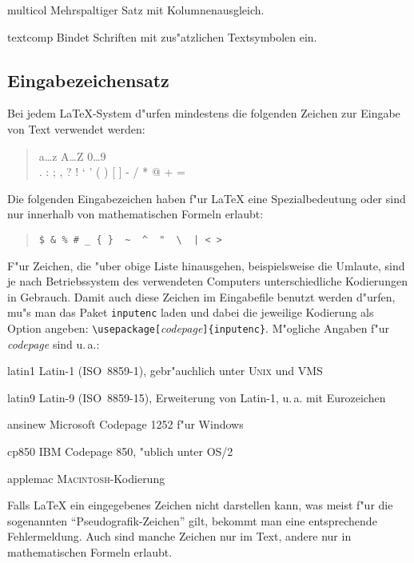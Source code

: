 \begin{table}[htbp]
\begin{ttdescription}
\item[multicol] Mehrspaltiger Satz mit Kolumnenausgleich.
\item[textcomp] Bindet Schriften mit zus"atzlichen Textsymbolen ein.
\end{ttdescription}
\unten
\end{table}


\subsection{Eingabezeichensatz}\label{inputenc}

Bei jedem \LaTeX-System d"urfen mindestens die folgenden
Zeichen zur Eingabe von Text verwendet werden:
\begin{quote}
  \ttfamily
  a\dots z A\dots Z 0\dots 9 \\
  . : ; , ? ! ` ' ( ) [ ] - / * @ + =
\end{quote}
Die folgenden Eingabezeichen haben f"ur \LaTeX{} eine Spezialbedeutung
oder sind nur innerhalb von mathematischen Formeln erlaubt:
\begin{quote}
\verb.$ & % # _ { }  ~  ^  "  \  | < >.
\end{quote}
F"ur Zeichen, die "uber obige Liste hinausgehen, beispielsweise die Umlaute,
sind je nach Betriebssystem des verwendeten Computers 
unterschiedliche Kodierungen in Gebrauch.  Damit auch diese Zeichen im 
Eingabe\-file benutzt werden d"urfen,  mu"s man das Paket 
\texttt{inputenc} laden und dabei die jeweilige Kodierung als 
Option angeben: \verb:\usepackage[:\textit{codepage}\verb:]{inputenc}:.
M"ogliche Angaben f"ur \textit{codepage} sind u.\,a.:
\begin{ttdescription}
  \item[latin1] Latin-1 (ISO~8859-1), gebr"auchlich unter \textsc{Unix} und VMS
  \item[latin9] Latin-9 (ISO~8859-15), Erweiterung von Latin-1, u.\,a. mit Eurozeichen
  \item[ansinew] Microsoft Codepage 1252 f"ur Windows
  \item[cp850] IBM Codepage 850, "ublich unter OS/2
  \item[applemac] \textsc{Macintosh}-Kodierung
\end{ttdescription}
Falls \LaTeX{} ein eingegebenes Zeichen nicht darstellen
kann, was meist f"ur die sogenannten "`Pseudografik-Zeichen"' 
gilt,  bekommt man eine entsprechende Fehlermeldung.
Auch sind manche Zeichen nur im Text, andere nur in mathematischen 
Formeln erlaubt.

